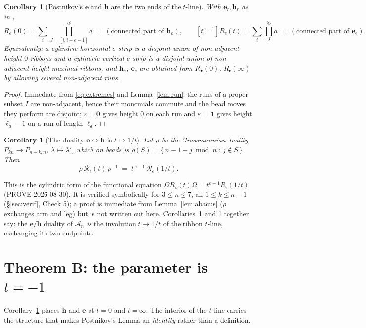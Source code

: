 \documentclass[11pt]{article}
\theoremstyle{plain}
\newtheorem{corollary}[theorem]{Corollary}
\theoremstyle{definition}
\newcommand{\A}{\mathscr{A}}
\begin{document}
\begin{corollary}[Postnikov's $\mathbf e$ and $\mathbf h$ are the two ends
of the $t$-line]\label{cor:ends}
With $\mathbf e_r,\mathbf h_r$ as in \cite[ll.2853--2857]{Pos},
\[
R_e(0)=\sum_{i}\textstyle\prod^{\circlearrowleft}_{J=[i,i+e-1]}a
\ =\ (\text{connected part of }\mathbf h_e),
\qquad
[t^{e-1}]R_e(t)=\sum_i\textstyle\prod^{\circlearrowright}_{J}a
\ =\ (\text{connected part of }\mathbf e_e).
\]
Equivalently: a cylindric horizontal $e$-strip is a disjoint union of
non-adjacent height-$0$ ribbons and a cylindric vertical $e$-strip is a
disjoint union of non-adjacent height-maximal ribbons, and $\mathbf h_e$,
$\mathbf e_e$ are obtained from $R_{\bullet}(0)$, $R_\bullet(\infty)$ by
allowing several non-adjacent runs.
\end{corollary}

\begin{proof}
Immediate from \eqref{eq:extremes} and Lemma~\ref{lem:run}: the runs of
a proper subset $I$ are non-adjacent, hence their monomials commute and
the bead moves they perform are disjoint; $\varepsilon=\mathbf 0$ gives
height $0$ on each run and $\varepsilon=\mathbf 1$ gives height
$\ell_a-1$ on a run of length $\ell_a$.
\end{proof}

\begin{corollary}[The duality $\mathbf e\leftrightarrow\mathbf h$ is
$t\mapsto 1/t$]\label{cor:duality}
Let $\rho$ be the Grassmannian duality $P_{kn}\to P_{n-k,n}$,
$\lambda\mapsto\lambda'$, which on beads is
$\rho(S)=\{\,n-1-j \bmod n\ :\ j\notin S\,\}$.  Then
\[
\rho\, \mathcal R_e(t)\,\rho^{-1}\;=\;t^{\,e-1}\,\mathcal R_e(1/t).
\]
\end{corollary}
\noindent
This is the cylindric form of the functional equation $\Omega
R_e(t)\Omega=t^{e-1}R_e(1/t)$ (PROVE 2026-08-30).  It is verified
symbolically for $3\le n\le 7$, all $1\le k\le n-1$ (\S\ref{sec:verif},
Check 5); a proof is immediate from Lemma~\ref{lem:abacus}
($\rho$ exchanges arm and leg) but is not written out here.
Corollaries~\ref{cor:ends} and \ref{cor:duality} together say: the
$\mathbf e/\mathbf h$ duality of $\A_n$ \emph{is} the involution
$t\mapsto1/t$ of the ribbon $t$-line, exchanging its two endpoints.

\section{Theorem B: the parameter is $t=-1$}\label{sec:t}

Corollary~\ref{cor:ends} places $\mathbf h$ and $\mathbf e$ at $t=0$ and
$t=\infty$.  The interior of the $t$-line carries the structure that
makes Postnikov's Lemma an \emph{identity} rather than a definition.
\end{document}
